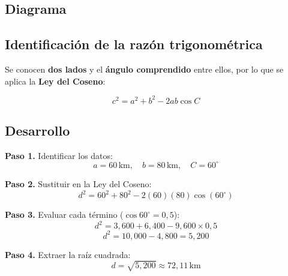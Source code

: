\documentclass[11pt, letterpaper]{article}
\begin{document}
\subsection*{Diagrama}

\begin{center}
\end{center}

\subsection*{Identificación de la razón trigonométrica}

Se conocen \textbf{dos lados} y el \textbf{ángulo comprendido} entre ellos, por lo que
se aplica la \textbf{Ley del Coseno}:

\begin{formulabox}
\[
  c^2 = a^2 + b^2 - 2ab\cos C
\]
\end{formulabox}

\subsection*{Desarrollo}

\textbf{Paso 1.} Identificar los datos:
\[
  a = 60\,\text{km},\quad b = 80\,\text{km},\quad C = 60^\circ
\]

\textbf{Paso 2.} Sustituir en la Ley del Coseno:
\[
  d^2 = 60^2 + 80^2 - 2(60)(80)\cos(60^\circ)
\]

\textbf{Paso 3.} Evaluar cada término (\(\cos 60^\circ = 0{,}5\)):
\[
  d^2 = 3{,}600 + 6{,}400 - 9{,}600 \times 0{,}5
\]
\[
  d^2 = 10{,}000 - 4{,}800 = 5{,}200
\]

\textbf{Paso 4.} Extraer la raíz cuadrada:
\[
  d = \sqrt{5{,}200} \approx 72{,}11\,\text{km}
\]
\end{document}
